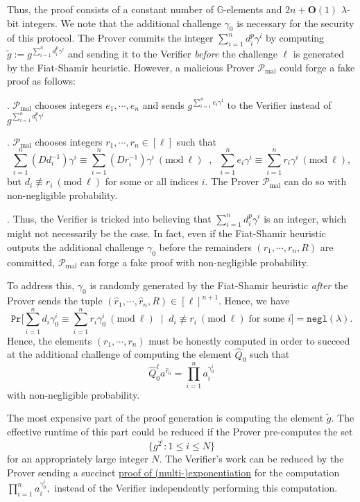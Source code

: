 \documentclass[11pt, lettersize, notitlepage, leqno, footskip=0.6cm]{article}
\newcommand{\pl}{\prod\limits}
\newcommand{\slim}{\sum\limits}
\newcommand{\ttt}{\texttt}
\newcommand{\negl}{\ttt{{negl}}}
\newcommand{\wti}{\widetilde}
\newcommand{\mc}{\mathcal}
\newcommand{\mb}{\mathbb}
\newcommand{\mbf}{\mathbf}
\newcommand{\mr}{\mathrm}
\newcommand{\lam}{\lambda}
\newcommand{\what}{\widehat}
\newcommand{\Prob}{\ttt{Pr}}
\newcommand{\bO}{\mbf{O}}
\newcommand{\mP}{\mc{P}}
\newcommand{\vs}{\vspace{-0.15cm}}
\newcommand{\noin}{\noindent}
\newcommand{\Mod}[1]{\ (\mathrm{mod}\ #1)}
\numberwithin{equation}{section}
\begin{document}
\vspace{0.2cm}

Thus, the proof consists of a constant number of $\mb{G}$-elements and $2n+\bO(1)$ $\lam$-bit integers. We note that the additional challenge $\gamma_{0}$ is necessary for the security of this protocol. The Prover commits the integer $\slim_{i=1}^n d_i^{p}\gamma^i$ by computing $\wti{g} := g^{\slim_{i=1}^n d_i^{p}\gamma^i}$ and sending it to the Verifier \textit{before} the challenge $\ell$ is generated by the Fiat-Shamir heuristic. However, a malicious Prover $\mP_{\mr{mal}}$ could forge a fake proof as follows:

\noin 1. $\mP_{\mr{mal}}$ chooses integers $e_1,\cdots,e_n$ and sends $g^{\slim_{i=1}^n e_i\gamma^i}$ to the Verifier instead of $g^{\slim_{i=1}^n d_i^{p}\gamma^i}$

\noin 2. $\mP_{\mr{mal}}$ chooses integers $r_1,\cdots,r_n\in [\ell]$ such that \vs $$\slim_{i=1}^n (Dd_i^{-1})\gamma^i \equiv \slim_{i=1}^n (Dr_i^{-1})\gamma^i \Mod{\ell}\;\;,\;\; \slim_{i=1}^n e_i\gamma^i\equiv \slim_{i=1}^n r_i\gamma^i \Mod{\ell},$$ but $d_i\not\equiv r_i\Mod{\ell}$ for some or all indices $i$. The Prover $\mP_{\mr{mal}}$ can do so  with non-negligible probability.

\noin 3. Thus, the Verifier is tricked into believing that $\slim_{i=1}^n d_i^{p}\gamma^i$ is an integer, which  might not necessarily be the case. In fact, even if the Fiat-Shamir heuristic outputs the additional challenge $\gamma_{0}$ before the remainders $(r_1,\cdots,r_n, R)$ are committed, $\mP_{\mr{mal}}$ can forge a fake proof with non-negligible probability. 

To address this, $\gamma_{0}$ is randomly generated by the Fiat-Shamir heuristic \textit{after} the Prover sends the tuple $(\what{r}_1,\cdots,\what{r}_n, R)\in[\ell]^{n+1}$. Hence, we have \vs $$\Prob\Big[\slim_{i=1}^n d_i\gamma_{0}^i \equiv \slim_{i=1}^n r_i\gamma_{0}^i \Mod{\ell}\;\;\Big|\;\; d_i\not\equiv r_i\Mod{\ell}\;\text{for some } i\Big] = \negl(\lam). $$ Hence, the elements $(r_1,\cdots,r_n)$ must be honestly computed in order to succeed at the additional challenge of computing the element $\what{Q}_0$ such that \vs $$\what{Q}_0^{\ell}a^{\what{r}_0}= \pl_{i=1}^{n} a_i^{\gamma_{0}^i} $$ with non-negligible probability.

The most expensive part of the proof generation is computing the element $\wti{g}$. The effective runtime of this part could be reduced if the Prover pre-computes the set \vs $$\{g^{2^i}: 1\leq i\leq N \} $$ for an appropriately large integer $N$. The Verifier's work can be reduced by the Prover sending a succinct \hyperlink{PoME}{proof of (multi-)exponentiation} for the computation $\prod_{i=1}^n a_i^{\gamma_{0}^i},$ instead of the Verifier independently performing this computation.
\end{document}
